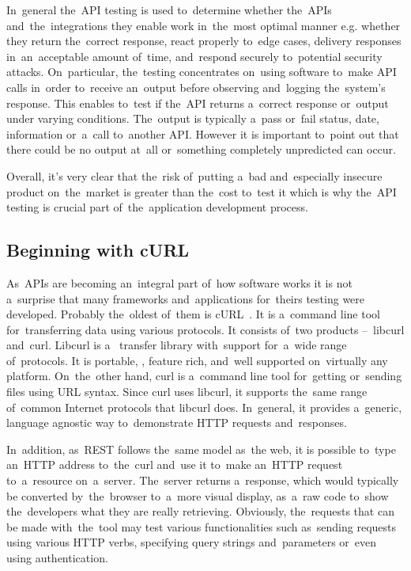 In~general the~API testing is used to~determine whether the~APIs
and~the~integrations they enable work in~the~most optimal manner e.g. whether
they return the~correct response, react properly to~edge cases, delivery
responses in~an~acceptable amount of~time, and~respond securely to~potential
security attacks. On~particular, the~testing concentrates on~using software
to~make API calls in~order to~receive an~output before observing and~logging
the~system's response. This enables to~test if the~API returns a~correct
response or~output under varying conditions. The~output is typically a~pass
or~fail status, date, information or~a~call to~another API. However it is
important to~point out that there could be no output at~all or~something
completely unpredicted can occur.

Overall, it's very clear that the~risk of~putting a~bad and~especially insecure
product on~the~market is greater than the~cost to~test it which is why the~API
testing is crucial part of~the~application development process.



\subsection{Beginning with cURL}
As~APIs are becoming an~integral part of~how software works it is not
a~surprise that many frameworks and~applications for~theirs testing were
developed. Probably the~oldest of~them is cURL~\cite{cURL}. It is a~command line
tool for~transferring data using various protocols. It consists of~two products
--~libcurl and~curl. Libcurl is a~ transfer library with~support
for~a~wide range of~protocols. It is portable, , feature rich,
and~well supported on~virtually any platform. On~the~other hand, curl is
a~command line tool for~getting or~sending files using URL syntax. Since curl
uses libcurl, it supports the~same range of~common Internet protocols that
libcurl does. In~general, it provides a~generic, language agnostic way
to~demonstrate HTTP requests and~responses.

In~addition, as~REST follows the~same model as~the web, it is possible to~type
an~HTTP address to~the~curl and~use it to~make an~HTTP request to~a~resource
on~a~server. The~server returns a~response, which would typically be converted
by~the~browser to~a~more visual display, as~a~raw code to~show the~developers
what they are really retrieving. Obviously, the~requests that can be made
with~the~tool may test various functionalities such as~sending requests using
various HTTP verbs, specifying query strings and~parameters or~even using
authentication.

